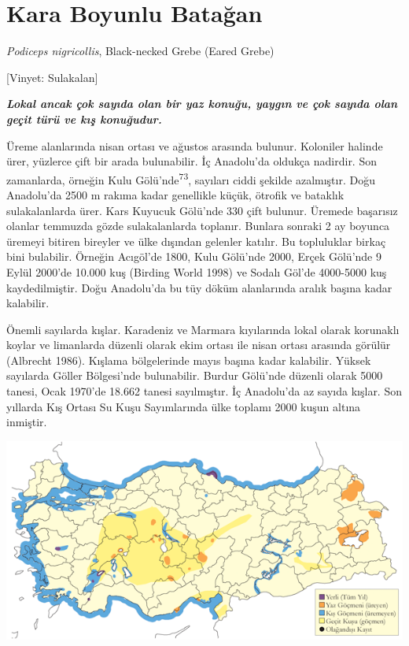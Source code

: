 \documentclass[
  letterpaper,
  DIV=11,
  numbers=noendperiod]{scrreprt}
\begin{document}
\section{Kara Boyunlu Batağan}\label{kara-boyunlu-bataux11fan}

\emph{Podiceps nigricollis}, Black-necked Grebe (Eared Grebe)

{[}Vinyet: Sulakalan{]}

\textbf{\emph{Lokal ancak çok sayıda olan bir yaz konuğu, yaygın ve çok
sayıda olan geçit türü ve kış konuğudur.}}

Üreme alanlarında nisan ortası ve ağustos arasında bulunur. Koloniler
halinde ürer, yüzlerce çift bir arada bulunabilir. İç Anadolu'da oldukça
nadirdir. Son zamanlarda, örneğin Kulu Gölü'nde\textsuperscript{73},
sayıları ciddi şekilde azalmıştır. Doğu Anadolu'da 2500 m rakıma kadar
genellikle küçük, ötrofik ve bataklık sulakalanlarda ürer. Kars Kuyucuk
Gölü'nde 330 çift bulunur. Üremede başarısız olanlar temmuzda gözde
sulakalanlarda toplanır. Bunlara sonraki 2 ay boyunca üremeyi bitiren
bireyler ve ülke dışından gelenler katılır. Bu topluluklar birkaç bini
bulabilir. Örneğin Acıgöl'de 1800, Kulu Gölü'nde 2000, Erçek Gölü'nde 9
Eylül 2000'de 10.000 kuş (Birding World 1998) ve Sodalı Göl'de 4000-5000
kuş kaydedilmiştir. Doğu Anadolu'da bu tüy döküm alanlarında aralık
başına kadar kalabilir.

Önemli sayılarda kışlar. Karadeniz ve Marmara kıyılarında lokal olarak
korunaklı koylar ve limanlarda düzenli olarak ekim ortası ile nisan
ortası arasında görülür (Albrecht 1986). Kışlama bölgelerinde mayıs
başına kadar kalabilir. Yüksek sayılarda Göller Bölgesi'nde bulunabilir.
Burdur Gölü'nde düzenli olarak 5000 tanesi, Ocak 1970'de 18.662 tanesi
sayılmıştır. İç Anadolu'da az sayıda kışlar. Son yıllarda Kış Ortası Su
Kuşu Sayımlarında ülke toplamı 2000 kuşun altına inmiştir.

\includegraphics{images/harita_Page_055.png}
\end{document}
